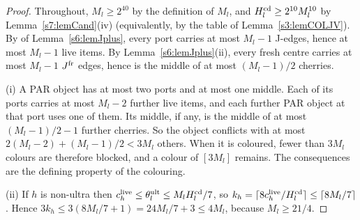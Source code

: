 \begin{proof}
Throughout, $M_l\ge2^{40}$ by the definition of $M_l$, and
$H^{\mathrm{cd}}_l\ge2^{10}M_l^{10}$ by Lemma~\ref{s7:lemCand}(iv) (equivalently, by the
table of Lemma~\ref{s3:lemCOLJV}). By  of Lemma~\ref{s6:lemJplus}, every
port carries at most $M_l-1$ J-edges, hence at most $M_l-1$ live items. By
Lemma~\ref{s6:lemJplus}(ii), every fresh centre carries at most $M_l-1$ $J^{\mathrm{fr}}$
edges, hence is the middle of at most $(M_l-1)/2$ cherries.

(i) A PAR object has at most two ports and at most one middle. Each of its ports
carries at most $M_l-2$ further live items, and each further PAR object at that
port uses one of them. Its middle, if any, is the middle of at most
$(M_l-1)/2-1$ further cherries. So the object conflicts with at most
$2(M_l-2)+(M_l-1)/2<3M_l$ others. When it is coloured, fewer than $3M_l$ colours
are therefore blocked, and a colour of $[3M_l]$ remains. The consequences are
the defining property of the colouring.

(ii) If $h$ is non-ultra then $c^{\mathrm{live}}_h\le\theta^{\mathrm{ult}}_l\le M_lH^{\mathrm{cd}}_l/7$, so
$k_h=\lceil8c^{\mathrm{live}}_h/H^{\mathrm{cd}}_l\rceil\le\lceil8M_l/7\rceil$. Hence
$3k_h\le3(8M_l/7+1)=24M_l/7+3\le4M_l$, because $M_l\ge21/4$.


\end{proof}
